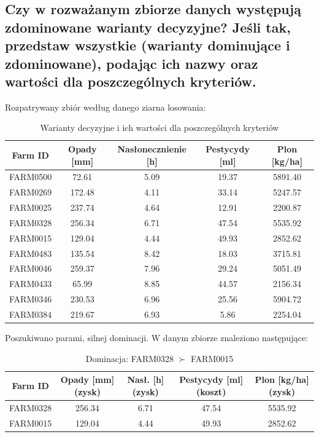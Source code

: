 \documentclass[11pt]{article}
\begin{document}
\subsection{Czy w rozważanym zbiorze danych występują zdominowane warianty decyzyjne? Jeśli tak, przedstaw wszystkie (warianty dominujące i zdominowane), podając ich nazwy oraz wartości dla poszczególnych kryteriów.}
Rozpatrywany zbiór według danego ziarna losowania:
\begin{table}[H]
\centering
\begin{tabular}{|c||c|c|c|c|}
\hline
\textbf{Farm ID} & \textbf{Opady [mm]} & \textbf{Nasłonecznienie [h]} & \textbf{Pestycydy [ml]} & \textbf{Plon [kg/ha]} \\
\hline
FARM0500 & 72.61 & 5.09 & 19.37 & 5891.40 \\ \hline
FARM0269 & 172.48 & 4.11 & 33.14 & 5247.57 \\ \hline
FARM0025 & 237.74 & 4.64 & 12.91 & 2200.87 \\ \hline
FARM0328 & 256.34 & 6.71 & 47.54 & 5535.92 \\ \hline
FARM0015 & 129.04 & 4.44 & 49.93 & 2852.62 \\ \hline
FARM0483 & 135.54 & 8.42 & 18.03 & 3715.81 \\ \hline
FARM0046 & 259.37 & 7.96 & 29.24 & 5051.49 \\ \hline
FARM0433 & 65.99 & 8.85 & 44.57 & 2156.34 \\ \hline
FARM0346 & 230.53 & 6.96 & 25.56 & 5904.72 \\ \hline
FARM0384 & 219.67 & 6.93 & 5.86  & 2254.04 \\
\hline
\end{tabular}
\caption{Warianty decyzyjne i ich wartości dla poszczególnych kryteriów}
\end{table}

Poszukiwano parami, silnej dominacji. W danym zbiorze znaleziono następujące:
\begin{table}[H]
\centering
\begin{tabular}{|c||c|c|c|c|}
\hline
\textbf{Farm ID} & \textbf{Opady [mm] (zysk)} & \textbf{Nasł. [h] (zysk)} & \textbf{Pestycydy [ml] (koszt)} & \textbf{Plon [kg/ha] (zysk)} \\
\hline
FARM0328 & 256.34 & 6.71 & 47.54 & 5535.92 \\ \hline
FARM0015 & 129.04 & 4.44 & 49.93 & 2852.62 \\
\hline
\end{tabular}
\caption{Dominacja: FARM0328 $\succ$ FARM0015}
\end{table}
\end{document}

